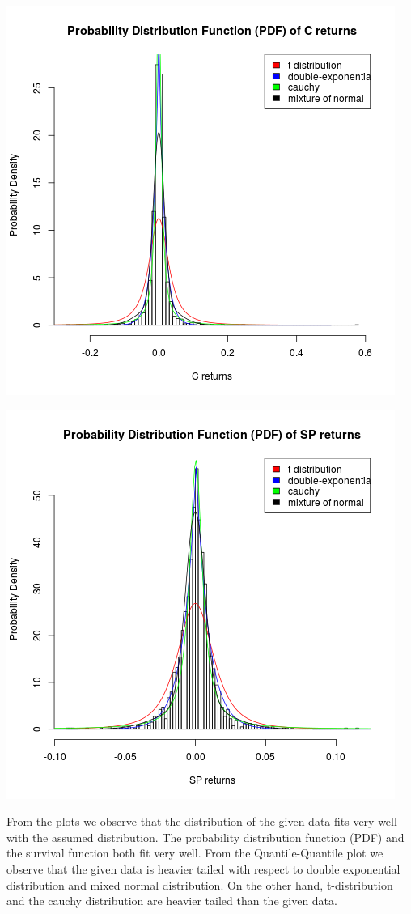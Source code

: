 \documentclass{article}
\begin{document}
\includegraphics{"plotb1"}
\pagebreak

\includegraphics{"plotb2"}
\pagebreak

From the plots we observe that the distribution of the given data fits very well with the assumed distribution. The probability distribution function (PDF) and the survival function both fit very well. From the Quantile-Quantile plot we observe that the given data is heavier tailed with respect to double exponential distribution and mixed normal distribution. On the other hand, t-distribution and the cauchy distribution are heavier tailed than the given data.
\end{document}
